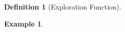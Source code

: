 \documentclass[a4paper,twoside,12pt,openany]{report}
\theoremstyle{plain}
\theoremstyle{definition}
\newtheorem{definition}{Definition}
\newtheorem{example}{Example}
\theoremstyle{remark}
\begin{document}
\begin{definition}[Exploration Function]
\begin{example}


\end{example}

\end{definition}
\end{document}
